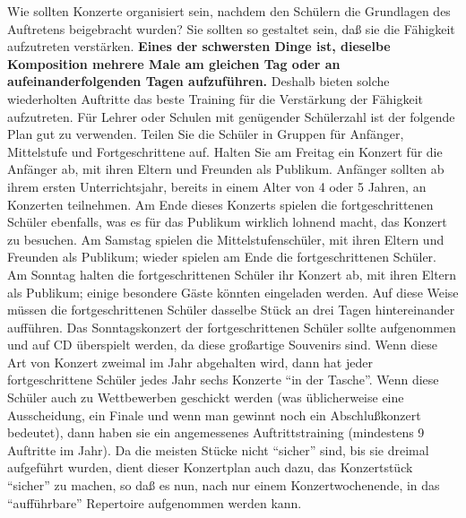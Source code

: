 Wie sollten Konzerte organisiert sein, nachdem den Schülern die Grundlagen des Auftretens beigebracht wurden?
Sie sollten so gestaltet sein, daß sie die Fähigkeit aufzutreten verstärken.
\textbf{Eines der schwersten Dinge ist, dieselbe Komposition mehrere Male am gleichen Tag oder an aufeinanderfolgenden Tagen aufzuführen.}
Deshalb bieten solche wiederholten Auftritte das beste Training für die Verstärkung der Fähigkeit aufzutreten.
Für Lehrer oder Schulen mit genügender Schülerzahl ist der folgende Plan gut zu verwenden.
Teilen Sie die Schüler in Gruppen für Anfänger, Mittelstufe und Fortgeschrittene auf.
Halten Sie am Freitag ein Konzert für die Anfänger ab, mit ihren Eltern und Freunden als Publikum.
Anfänger sollten ab ihrem ersten Unterrichtsjahr, bereits in einem Alter von 4 oder 5 Jahren, an Konzerten teilnehmen.
Am Ende dieses Konzerts spielen die fortgeschrittenen Schüler ebenfalls, was es für das Publikum wirklich lohnend macht, das Konzert zu besuchen.
Am Samstag spielen die Mittelstufenschüler, mit ihren Eltern und Freunden als Publikum; wieder spielen am Ende die fortgeschrittenen Schüler.
Am Sonntag halten die fortgeschrittenen Schüler ihr Konzert ab, mit ihren Eltern als Publikum; einige besondere Gäste könnten eingeladen werden.
Auf diese Weise müssen die fortgeschrittenen Schüler dasselbe Stück an drei Tagen hintereinander aufführen.
Das Sonntagskonzert der fortgeschrittenen Schüler sollte aufgenommen und auf CD überspielt werden, da diese großartige Souvenirs sind.
Wenn diese Art von Konzert zweimal im Jahr abgehalten wird, dann hat jeder fortgeschrittene Schüler jedes Jahr sechs Konzerte \enquote{in der Tasche}.
Wenn diese Schüler auch zu Wettbewerben geschickt werden (was üblicherweise eine Ausscheidung, ein Finale und wenn man gewinnt noch ein Abschlußkonzert bedeutet), dann haben sie ein angemessenes Auftrittstraining (mindestens 9 Auftritte im Jahr).
Da die meisten Stücke nicht \enquote{sicher} sind, bis sie dreimal aufgeführt wurden, dient dieser Konzertplan auch dazu, das Konzertstück \enquote{sicher} zu machen, so daß es nun, nach nur einem Konzertwochenende, in das \enquote{aufführbare} Repertoire aufgenommen werden kann.

